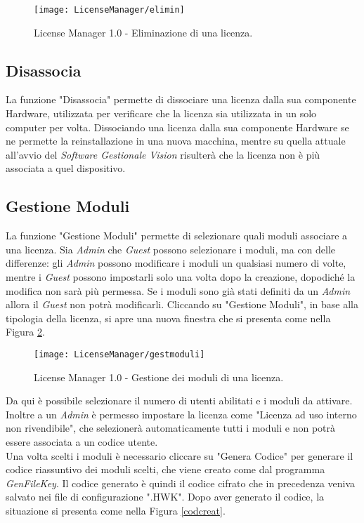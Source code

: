 \begin{figure}[!h] 
    \centering 
    \texttt{[image: LicenseManager/elimin]} 
    \caption{License Manager 1.0 - Eliminazione di una licenza.}
\label{elim}
\end{figure}

\subsection{Disassocia}

La funzione "Disassocia" permette di dissociare una licenza dalla sua componente Hardware, utilizzata per verificare che la licenza sia utilizzata in un solo computer per volta. 
Dissociando una licenza dalla sua componente Hardware se ne permette la reinstallazione in una nuova macchina, mentre su quella attuale all’avvio del \textit{Software Gestionale Vision} risulterà che la licenza non è più associata a quel dispositivo.

\subsection{Gestione Moduli}
\label{gestmod}
La funzione "Gestione Moduli" permette di selezionare quali moduli associare a una licenza. Sia \textit{Admin} che \textit{Guest} possono selezionare i moduli, ma con delle differenze: gli \textit{Admin} possono modificare i moduli un qualsiasi numero di volte, mentre i \textit{Guest} possono impostarli solo una volta dopo la creazione, dopodiché la modifica non sarà più permessa. Se i moduli sono già stati definiti da un \textit{Admin} allora il \textit{Guest} non potrà modificarli.
Cliccando su "Gestione Moduli", in base alla tipologia della licenza, si apre una nuova finestra che si presenta come nella Figura \ref{gest}.

\begin{figure}[!h] 
    \centering 
    \texttt{[image: LicenseManager/gestmoduli]} 
    \caption{License Manager 1.0 - Gestione dei moduli di una licenza.}
\label{gest}
\end{figure}

Da qui è possibile selezionare il numero di utenti abilitati e i moduli da attivare. Inoltre a un \textit{Admin} è permesso impostare la licenza come "Licenza ad uso interno non rivendibile", che selezionerà automaticamente tutti i moduli e non potrà essere associata a un codice utente.\\
Una volta scelti i moduli è necessario cliccare su "Genera Codice" per generare il codice riassuntivo dei moduli scelti, che viene creato come dal programma \textit{GenFileKey}. Il codice generato è quindi il codice cifrato che in precedenza veniva salvato nei file di configurazione ".HWK".  Dopo aver generato il codice, la situazione si presenta come nella Figura \ref{codcreat}.


